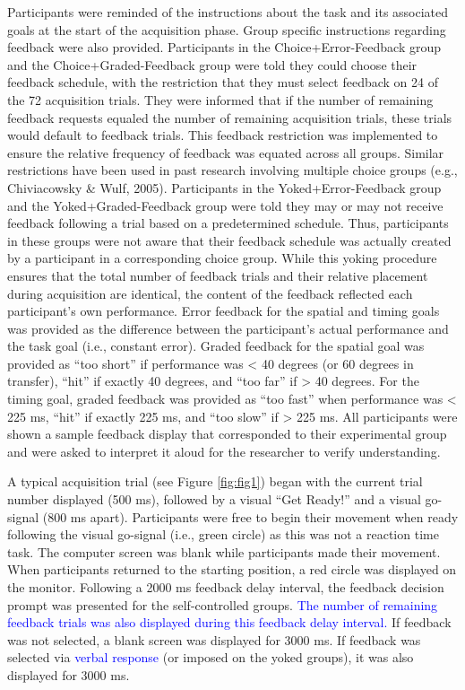 \documentclass[
  man, donotrepeattitle,floatsintext]{apa7}
\begin{document}
Participants were reminded of the instructions about the task and its associated goals at the start of the acquisition phase. Group specific instructions regarding feedback were also provided. Participants in the Choice+Error-Feedback group and the Choice+Graded-Feedback group were told they could choose their feedback schedule, with the restriction that they must select feedback on 24 of the 72 acquisition trials. They were informed that if the number of remaining feedback requests equaled the number of remaining acquisition trials, these trials would default to feedback trials. This feedback restriction was implemented to ensure the relative frequency of feedback was equated across all groups. Similar restrictions have been used in past research involving multiple choice groups (e.g., Chiviacowsky \& Wulf, 2005). Participants in the Yoked+Error-Feedback group and the Yoked+Graded-Feedback group were told they may or may not receive feedback following a trial based on a predetermined schedule. Thus, participants in these groups were not aware that their feedback schedule was actually created by a participant in a corresponding choice group. While this yoking procedure ensures that the total number of feedback trials and their relative placement during acquisition are identical, the content of the feedback reflected each participant's own performance. Error feedback for the spatial and timing goals was provided as the difference between the participant's actual performance and the task goal (i.e., constant error). Graded feedback for the spatial goal was provided as ``too short'' if performance was \textless{} 40 degrees (or 60 degrees in transfer), ``hit'' if exactly 40 degrees, and ``too far'' if \textgreater{} 40 degrees. For the timing goal, graded feedback was provided as ``too fast'' when performance was \textless{} 225 ms, ``hit'' if exactly 225 ms, and ``too slow'' if \textgreater{} 225 ms. All participants were shown a sample feedback display that corresponded to their experimental group and were asked to interpret it aloud for the researcher to verify understanding.

A typical acquisition trial (see Figure \ref{fig:fig1}) began with the current trial number displayed (500 ms), followed by a visual ``Get Ready!'' and a visual go-signal (800 ms apart). Participants were free to begin their movement when ready following the visual go-signal (i.e., green circle) as this was not a reaction time task. The computer screen was blank while participants made their movement. When participants returned to the starting position, a red circle was displayed on the monitor. Following a 2000 ms feedback delay interval, the feedback decision prompt was presented for the self-controlled groups. \textcolor{blue}{The number of remaining feedback trials was also displayed during this feedback delay interval.} If feedback was not selected, a blank screen was displayed for 3000 ms. If feedback was selected via \textcolor{blue}{verbal response} (or imposed on the yoked groups), it was also displayed for 3000 ms.
\end{document}
